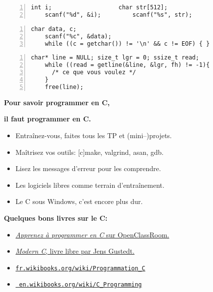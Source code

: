 \documentclass[a4paper,10pt,landscape]{article}
\newcommand{\Subsection}[1]{{\textbf{#1}}}
\begin{document}
\begin{multicols}{3}

  \smallskip
  \begin{Verbatim}[label=Lire un entier ou une chaîne,
    gobble=4,frame=single,numbers=left,numbersep=2pt]
    int i;                   char str[512];
    scanf("%d", &i);         scanf("%s", str);
  \end{Verbatim}  
  \begin{Verbatim}[label=Lire un caractère et vider le buffer,
    gobble=4,frame=single,numbers=left,numbersep=2pt]
    char data, c;
    scanf("%c", &data);
    while ((c = getchar()) != '\n' && c != EOF) { }
  \end{Verbatim}  
  \begin{Verbatim}[label=Lecture d'un fichier ligne à ligne, gobble=4, frame=single,
    numbers=left,numbersep=2pt]
    char* line = NULL; size_t lgr = 0; ssize_t read;
    while ((read = getline(&line, &lgr, fh) != -1){
      /* ce que vous voulez */
    }
    free(line);
  \end{Verbatim}  


  \centerline{\bf\large Pour savoir programmer en C,}
  \centerline{\bf\large il faut programmer en C.}
  \begin{itemize}[noitemsep]
  \item Entraînez-vous, faites tous les TP et (mini--)projets.
  \item Maîtrisez vos outils: [c]make, valgrind, asan, gdb.
  \item Lisez les messages d'erreur pour les comprendre.
  \item Les logiciels libres comme terrain d'entraînement.
  \item Le C sous Windows, c'est encore plus dur.
  \end{itemize}
  \vspace{-.2\baselineskip}

  \Subsection{Quelques bons livres sur le C:}
  \begin{itemize}[noitemsep,nolistsep]
  \item
    \href{https://openclassrooms.com/courses/apprenez-a-programmer-en-c}
    {{\it Apprenez à programmer en C} sur OpenClassRoom.}
  \item
    \href{http://icube-icps.unistra.fr/index.php/File:ModernC.pdf}
      {{\it Modern C}, livre libre par Jens Gustedt.}
  \item \href{https://fr.wikibooks.org/wiki/Programmation_C}{\tt fr.wikibooks.org/wiki/Programmation\_C}
  \item \href{https://en.wikibooks.org/wiki/C_Programming}{\tt
      en.wikibooks.org/wiki/C\_Programming}
     

\end{itemize}
\end{multicols}
\end{document}
